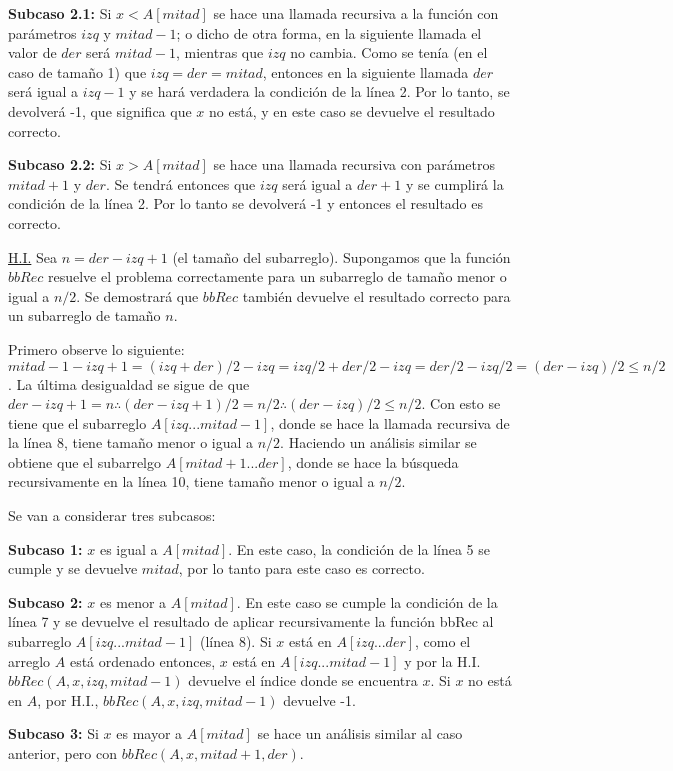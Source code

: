 \documentclass{article}
\begin{document}
\textbf{Subcaso 2.1:} Si $x < A[mitad]$ se hace una llamada recursiva a la función con parámetros $izq$ y $mitad-1$; o dicho de otra forma, en la siguiente llamada el valor de $der$ será $mitad-1$, mientras que $izq$ no cambia. Como se tenía (en el caso de tamaño 1) que $izq = der = mitad$, entonces en la siguiente llamada $der$ será igual a $izq-1$ y se hará verdadera la condición de la línea 2. Por lo tanto, se devolverá -1, que significa que $x$ no está, y en este caso se devuelve el resultado correcto.

\textbf{Subcaso 2.2:} Si $x > A[mitad]$ se hace una llamada recursiva con parámetros $mitad+1$ y $der$. Se tendrá entonces que $izq$ será igual a $der+1$ y se cumplirá la condición de la línea 2. Por lo tanto se devolverá -1 y entonces el resultado es correcto.

\underline{H.I.} Sea $n = der-izq+1$ (el tamaño del subarreglo). Supongamos que la función $bbRec$ resuelve el problema correctamente para un subarreglo de tamaño menor o igual a $n/2$. Se demostrará que $bbRec$ también devuelve el resultado correcto para un subarreglo de tamaño $n$.

Primero observe lo siguiente: $mitad-1-izq+1 = (izq+der)/2-izq = izq/2+der/2-izq = der/2-izq/2 = (der-izq)/2 \leq n/2$. La última desigualdad se sigue de que $der-izq+1 = n \therefore (der-izq+1)/2 = n/2 \therefore (der-izq)/2 \leq n/2$. Con esto se tiene que el subarreglo $A[izq...mitad-1]$, donde se hace la llamada recursiva de la línea 8, tiene tamaño menor o igual a $n/2$. Haciendo un análisis similar se obtiene que el subarrelgo $A[mitad+1...der]$, donde se hace la búsqueda recursivamente en la línea 10, tiene tamaño menor o igual a $n/2$.

Se van a considerar tres subcasos:

\textbf{Subcaso 1:} $x$ es igual a $A[mitad]$. En este caso, la condición de la línea 5 se cumple y se devuelve $mitad$, por lo tanto para este caso es correcto.

\textbf{Subcaso 2:} $x$ es menor a $A[mitad]$. En este caso se cumple la condición de la línea 7 y se devuelve el resultado de aplicar recursivamente la función bbRec al subarreglo $A[izq...mitad-1]$ (línea 8). Si $x$ está en $A[izq...der]$, como el arreglo $A$ está ordenado entonces, $x$ está en $A[izq...mitad-1]$ y por la H.I. $bbRec(A, x, izq, mitad-1)$ devuelve el índice donde se encuentra $x$. Si $x$ no está en $A$, por H.I., $bbRec(A, x, izq, mitad-1)$ devuelve -1.

\textbf{Subcaso 3:} Si $x$ es mayor a $A[mitad]$ se hace un análisis similar al caso anterior, pero con $bbRec(A, x, mitad+1, der)$.
\end{document}
